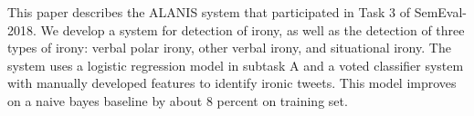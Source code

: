 This paper describes the ALANIS system that participated in Task 3 of SemEval-2018. We develop a system for detection of irony, as well as the detection of three types of irony: verbal polar irony, other verbal irony, and situational irony. The system uses a logistic regression model in subtask A and a voted classifier system with manually developed features to identify ironic tweets. This model improves on a naive bayes baseline by about 8 percent on training set.
